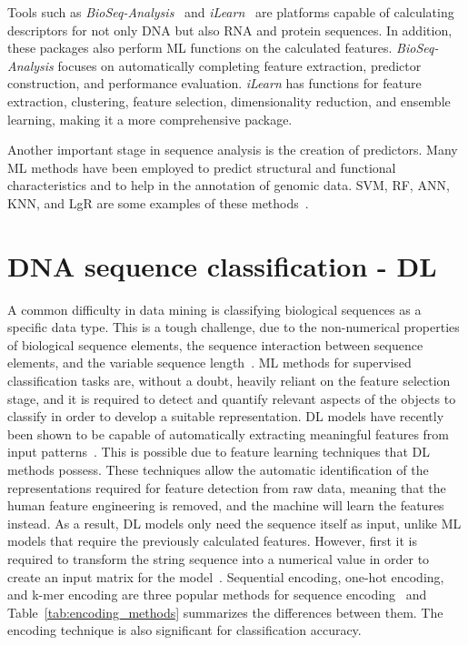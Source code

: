 Tools such as \textit{BioSeq-Analysis}~\cite{Liu2019BioSeq-Analysis:Approaches} and \textit{iLearn}~\cite{Chen2020ILearn:Data} are platforms capable of calculating descriptors for not only \gls{DNA} but also \gls{RNA} and protein sequences. In addition, these packages also perform \gls{ML} functions on the calculated features. \textit{BioSeq-Analysis} focuses on automatically completing feature extraction, predictor construction, and performance evaluation. \textit{iLearn} has functions for feature extraction, clustering, feature selection, dimensionality reduction, and ensemble learning, making it a more comprehensive package.

Another important stage in sequence analysis is the creation of predictors. Many \gls{ML} methods have been employed to predict structural and functional characteristics and to help in the annotation of genomic data. \gls{SVM}, \gls{RF}, \gls{ANN}, \gls{KNN}, and \gls{LgR} are some examples of these methods~\cite{Chen2020ILearn:Data}.



\section{DNA sequence classification - DL}

A common difficulty in data mining is classifying biological sequences as a specific data type. This is a tough challenge, due to the non-numerical properties of biological sequence elements, the sequence interaction between sequence elements, and the variable sequence length~\cite{Yang2020ReviewDNA}. \gls{ML} methods for supervised classification tasks are, without a doubt, heavily reliant on the feature selection stage, and it is required to detect and quantify relevant aspects of the objects to classify in order to develop a suitable representation. \gls{DL} models have recently been shown to be capable of automatically extracting meaningful features from input patterns~\cite{LoBosco2017DeepClassification}. This is possible due to feature learning techniques that \gls{DL} methods possess. These techniques allow the automatic identification of the representations required for feature detection from raw data, meaning that the human feature engineering is removed, and the machine will learn the features instead. As a result, \gls{DL} models only need the sequence itself as input, unlike \gls{ML} models that require the previously calculated features. However, first it is required to transform the string sequence into a numerical value in order to create an input matrix for the model~\cite{Yang2020ReviewDNA}. Sequential encoding, one-hot encoding, and k-mer encoding are three popular methods for sequence encoding~\cite{Choong2017EvaluationMethod} and Table~\ref{tab:encoding_methods} summarizes the differences between them. The encoding technique is also significant for classification accuracy.

